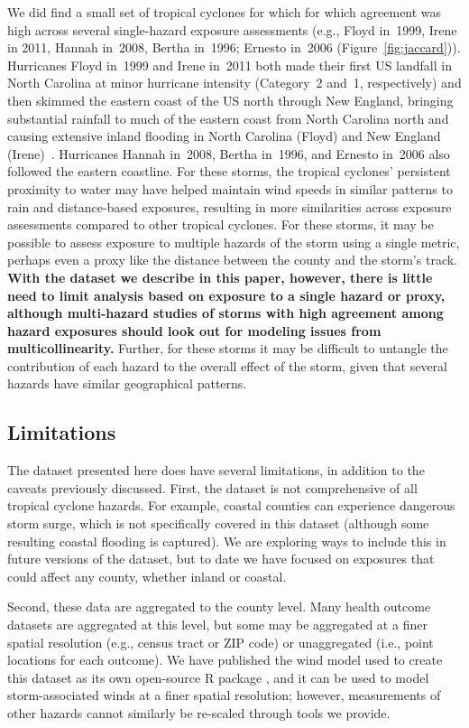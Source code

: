 We did find a small set of tropical cyclones for which for which agreement was
high across several single-hazard exposure assessments (e.g., Floyd in~1999,
Irene in 2011, Hannah in~2008, Bertha in~1996; Ernesto in~2006
(Figure~\ref{fig:jaccard})).  Hurricanes Floyd in~1999 and Irene in~2011 both
made their first \ac{US} landfall in North Carolina at minor hurricane
intensity (Category~2 and~1, respectively) and then skimmed the eastern coast
of the \ac{US} north through New England, bringing substantial rainfall to much
of the eastern coast from North Carolina north and causing extensive inland
flooding in North Carolina (Floyd) and New England
(Irene)~\parencite{avila2013atlantic, lawrence2000atlantic}.  Hurricanes Hannah
in~2008, Bertha in~1996, and Ernesto in~2006 also followed the eastern
coastline. For these storms, the tropical cyclones' persistent proximity to
water may have helped maintain wind speeds in similar patterns to rain and
distance-based exposures, resulting in more similarities across exposure
assessments compared to other tropical cyclones.  For these storms, it may be
possible to assess exposure to multiple hazards of the storm using a single
metric, perhaps even a proxy like the distance between the county and the
storm's track. \textbf{With the dataset we describe in this paper, however,
there is little need to limit analysis based on exposure to a single hazard or
proxy, although multi-hazard studies of storms with high agreement among hazard
exposures should look out for modeling issues from multicollinearity.} Further,
for these storms it may be difficult to untangle the contribution of each
hazard to the overall effect of the storm, given that several hazards have
similar geographical patterns. 

\subsection*{Limitations}

The dataset presented here does have several limitations, in addition to the
caveats previously discussed. First, the dataset is not comprehensive of all
tropical cyclone hazards. For example, coastal counties can experience
dangerous storm surge, which is not specifically covered in this dataset
(although some resulting coastal flooding is captured). We are exploring ways
to include this in future versions of the dataset, but to date we have focused
on exposures that could affect any county, whether inland or coastal.  

Second, these data are aggregated to the county level. Many health outcome
datasets are aggregated at this level, but some may be aggregated at a finer
spatial resolution (e.g., census tract or ZIP code) or unaggregated (i.e.,
point locations for each outcome). We have published the wind model used to
create this dataset as its own open-source R package
\parencite{stormwindmodel}, and it can be used to model storm-associated winds
at a finer spatial resolution; however, measurements of other hazards cannot
similarly be re-scaled through tools we provide. 

